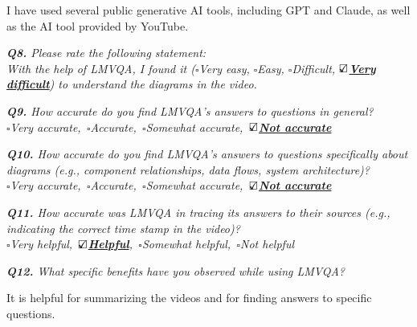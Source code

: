 
\begin{samepage}
\begin{mdframed}[style=MyFrame]
I have used several public generative AI tools, including GPT and Claude, as well as the AI tool provided by YouTube.
\end{mdframed}
\end{samepage}




\vspace*{1em}\noindent\textit{\textbf{Q8.} Please rate the following statement:
\\[.5em]
 \textit{With the help of LMVQA, I found it}
($\square$Very easy, $\square$Easy, $\square$Difficult, \underline{\bfseries$\text{\rlap{$\checkmark$}}\square$Very difficult})
to understand the diagrams in the video.
}


\vspace*{1em}\noindent\textit{\textbf{Q9.} How accurate do you find LMVQA's answers to questions in general?
\\[.5em]
        \indent$\square$Very accurate,\,
        $\square$Accurate,\,
        $\square$Somewhat accurate,\,
        \underline{\bfseries$\text{\rlap{$\checkmark$}}\square$Not accurate}
}



\vspace*{1em}\noindent\textit{\textbf{Q10.} How accurate do you find LMVQA's answers to questions specifically about diagrams (e.g., component relationships, data flows, system architecture)?
\\[.5em]
        \indent$\square$Very accurate,\,
        $\square$Accurate,\,
        $\square$Somewhat accurate,\,
        \underline{\bfseries$\text{\rlap{$\checkmark$}}\square$Not accurate}
}



\vspace*{1em}\noindent\textit{\textbf{Q11.} 
How accurate was LMVQA in tracing its answers to their sources
(e.g.,  indicating the correct time stamp in the video)?
\\[.5em]
\indent $\square$Very helpful,\,
\underline{\bfseries$\text{\rlap{$\checkmark$}}\square$Helpful},\,
$\square$Somewhat helpful,\,
$\square$Not helpful
}


\vspace*{1em}\noindent\textit{\textbf{Q12.} What specific benefits have you observed while using LMVQA?
}
\begin{samepage}
\begin{mdframed}[style=MyFrame]
It is helpful for summarizing the videos and for finding answers to specific questions.
\end{mdframed}
\end{samepage}

